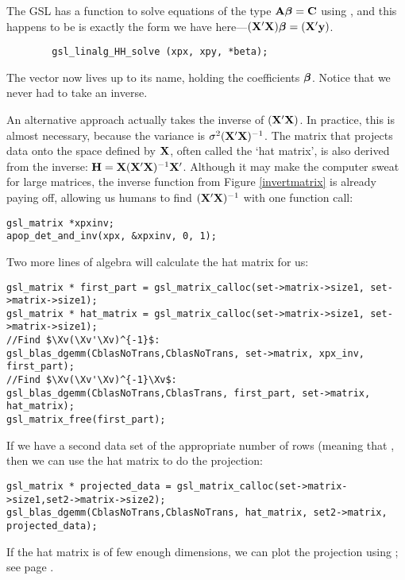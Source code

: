 The GSL has a function to solve equations of the type ${\bf A} {\mbox{\boldmath$\beta$}} =
{\bf C}$ using , and this happens to be is exactly the form we have here---$({\bf X}'{\bf X}){\mbox{\boldmath$\beta$}} = ({\bf X}'{\bf y})$.  \label{ols}
\begin{lstlisting}
        gsl_linalg_HH_solve (xpx, xpy, *beta);
\end{lstlisting}

The vector  now lives up to its name, holding the coefficients
${\mbox{\boldmath$\beta$}}$. Notice that we never had to take an inverse.  

An alternative approach actually takes the inverse of $({\bf X}'{\bf X})$. In practice, this is
almost necessary, because the variance is $\sigma^2 ({\bf X}'{\bf X})^{-1}$.
The matrix that projects data onto the space defined by ${\bf X}$,
often called the `hat matrix', is also derived from the inverse: ${\bf H} = {\bf X}({\bf X}'{\bf X})^{-1}{\bf X}'$. Although it may
make the computer sweat for large matrices, the inverse function
from Figure \ref{invertmatrix} is already paying off, allowing us humans to find
$({\bf X}'{\bf X})^{-1}$ with one function call:
\begin{lstlisting}
gsl_matrix *xpxinv;
apop_det_and_inv(xpx, &xpxinv, 0, 1);
\end{lstlisting}
Two more lines of algebra will calculate the hat matrix for us: 
\lstset{texcl=true}
\begin{lstlisting}
gsl_matrix * first_part = gsl_matrix_calloc(set->matrix->size1, set->matrix->size1);
gsl_matrix * hat_matrix = gsl_matrix_calloc(set->matrix->size1, set->matrix->size1);
//Find $\Xv(\Xv'\Xv)^{-1}$:
gsl_blas_dgemm(CblasNoTrans,CblasNoTrans, set->matrix, xpx_inv, first_part);	
//Find $\Xv(\Xv'\Xv)^{-1}\Xv$:
gsl_blas_dgemm(CblasNoTrans,CblasTrans, first_part, set->matrix, hat_matrix);	
gsl_matrix_free(first_part);
\end{lstlisting}
\lstset{texcl=false} %

If we have a second data set  of the appropriate number of
rows (meaning that , then we can use the hat matrix to do the projection:\\
\begin{lstlisting}
gsl_matrix * projected_data = gsl_matrix_calloc(set->matrix->size1,set2->matrix->size2);
gsl_blas_dgemm(CblasNoTrans,CblasNoTrans, hat_matrix, set2->matrix, projected_data);
\end{lstlisting}
If the hat matrix is of few enough dimensions, we can plot the
projection using ; see page \pageref{gnuprint}.

